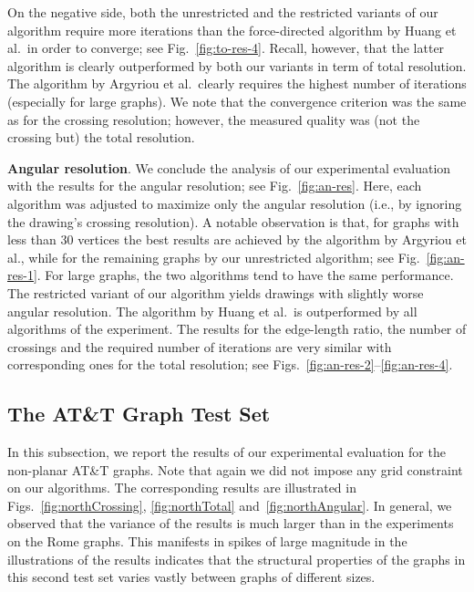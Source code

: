 \documentclass{comjnl}
\newcommand{\myparagraph}[1]{\medskip\noindent\textbf{#1}.}
\begin{document}
On the negative side, both the unrestricted and the restricted variants of our algorithm require more iterations than the force-directed algorithm by Huang et al.\ in order to converge; see Fig.~\ref{fig:to-res-4}. Recall, however, that the latter algorithm is clearly outperformed by both our variants in term of total resolution. The algorithm by Argyriou et al.\ clearly requires the highest number of iterations (especially for large graphs). We note that the convergence criterion was the same as for the crossing resolution; however, the measured quality was (not the crossing but) the total resolution.

\myparagraph{Angular resolution} We conclude the analysis of our experimental evaluation with the results for the angular resolution; see Fig.~\ref{fig:an-res}. Here, each algorithm was adjusted  to maximize only the angular resolution (i.e., by ignoring the drawing's crossing resolution). A notable observation is that, for graphs with less than $30$ vertices the best results are achieved by the algorithm by Argyriou et al., while for the remaining graphs by our unrestricted algorithm; see Fig.~\ref{fig:an-res-1}. For large graphs, the two algorithms tend to have the same performance. The restricted variant of our algorithm yields drawings with slightly worse angular resolution. The algorithm by Huang et al.\ is outperformed by all algorithms of the experiment.
%
The results for the edge-length ratio, the number of crossings and the required number of iterations are very similar with corresponding ones for the total resolution; see Figs.~\ref{fig:an-res-2}--\ref{fig:an-res-4}.%

\subsection{The AT\&T  Graph Test Set}
\label{ssec:north}

In this subsection, we report the results of our experimental evaluation for the non-planar AT\&T graphs. Note that again we did not impose any grid constraint on our algorithms. The corresponding results are illustrated in Figs.~\ref{fig:northCrossing}, \ref{fig:northTotal} and~\ref{fig:northAngular}. In general, we observed that the variance of the results is much larger than in the experiments on the Rome graphs. This manifests in spikes of large magnitude in the illustrations of the results indicates that the structural properties of the graphs in this second test set varies vastly between graphs of different sizes.
\end{document}
